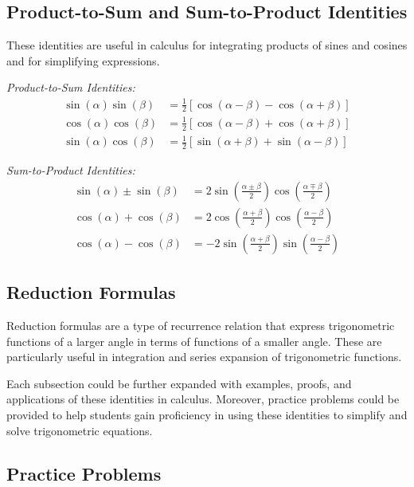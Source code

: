 \documentclass[a4paper,12pt]{book}
\newcounter{problem}
\newcounter{example}
\begin{document}
\subsection{Product-to-Sum and Sum-to-Product Identities}
\label{subsec:product_sum_identities}
These identities are useful in calculus for integrating products of sines and cosines and for simplifying expressions.

\textit{Product-to-Sum Identities:}
\begin{align*}
\sin(\alpha)\sin(\beta) &= \frac{1}{2}[\cos(\alpha - \beta) - \cos(\alpha + \beta)] \\
\cos(\alpha)\cos(\beta) &= \frac{1}{2}[\cos(\alpha - \beta) + \cos(\alpha + \beta)] \\
\sin(\alpha)\cos(\beta) &= \frac{1}{2}[\sin(\alpha + \beta) + \sin(\alpha - \beta)]
\end{align*}

\textit{Sum-to-Product Identities:}
\begin{align*}
\sin(\alpha) \pm \sin(\beta) &= 2\sin\left(\frac{\alpha \pm \beta}{2}\right)\cos\left(\frac{\alpha \mp \beta}{2}\right) \\
\cos(\alpha) + \cos(\beta) &= 2\cos\left(\frac{\alpha + \beta}{2}\right)\cos\left(\frac{\alpha - \beta}{2}\right) \\
\cos(\alpha) - \cos(\beta) &= -2\sin\left(\frac{\alpha + \beta}{2}\right)\sin\left(\frac{\alpha - \beta}{2}\right)
\end{align*}

\subsection{Reduction Formulas}
\label{subsec:reduction_formulas}
Reduction formulas are a type of recurrence relation that express trigonometric functions of a larger angle in terms of functions of a smaller angle. These are particularly useful in integration and series expansion of trigonometric functions.


Each subsection could be further expanded with examples, proofs, and applications of these identities in calculus. Moreover, practice problems could be provided to help students gain proficiency in using these identities to simplify and solve trigonometric equations.

\subsection{Practice Problems}
\label{subsec:practice_problems_trig_identities}
\end{document}

